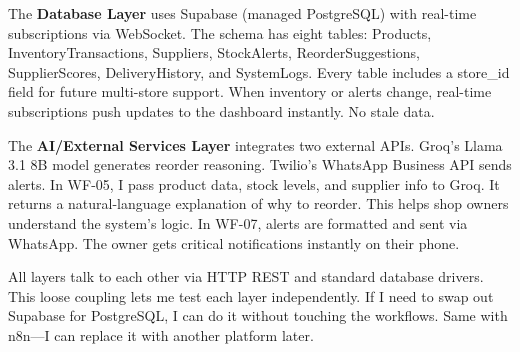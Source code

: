 \documentclass[journal]{IEEEtran}
\begin{document}
The \textbf{Database Layer} uses Supabase (managed PostgreSQL) with real-time subscriptions via WebSocket. The schema has eight tables: Products, InventoryTransactions, Suppliers, StockAlerts, ReorderSuggestions, SupplierScores, DeliveryHistory, and SystemLogs. Every table includes a store\_id field for future multi-store support. When inventory or alerts change, real-time subscriptions push updates to the dashboard instantly. No stale data.

The \textbf{AI/External Services Layer} integrates two external APIs. Groq's Llama 3.1 8B model generates reorder reasoning. Twilio's WhatsApp Business API sends alerts. In WF-05, I pass product data, stock levels, and supplier info to Groq. It returns a natural-language explanation of why to reorder. This helps shop owners understand the system's logic. In WF-07, alerts are formatted and sent via WhatsApp. The owner gets critical notifications instantly on their phone.

All layers talk to each other via HTTP REST and standard database drivers. This loose coupling lets me test each layer independently. If I need to swap out Supabase for PostgreSQL, I can do it without touching the workflows. Same with n8n—I can replace it with another platform later.
\end{document}
